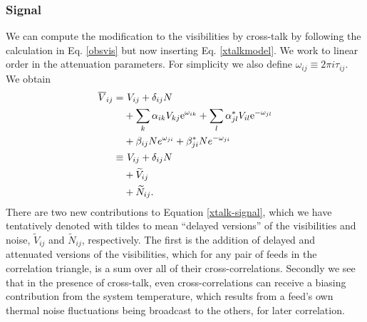 \subsubsection{Signal}
We can compute the modification to the visibilities by cross-talk by following the calculation in Eq. \ref{obsvis} but now inserting Eq. \ref{xtalkmodel}. We work to linear order in the attenuation parameters. For simplicity we also define $\omega_{ij} \equiv 2\pi i \tau_{ij}$. We obtain
\begin{align}
\overline{V}_{ij} = &~ V_{ij} + \delta_{ij} N
\nonumber \\
&+ \sum_k \alpha_{ik} V_{kj} {\rm e}^{\omega_{ik}} + \sum_l \alpha^*_{jl} V_{il} {\rm e}^{-\omega_{jl}}
\nonumber \\
&+ \beta_{ij} N e^{\omega_{ji}} + \beta_{ji}^*N e^{- \omega_{ji}}
\label{xtalk-signal} \\ \nonumber
\equiv &~ V_{ij} + \delta_{ij} N
\\ \nonumber &+ \widetilde{V}_{ij}
\\ &+ \widetilde{N}_{ij}. \label{tilde-def}
\end{align}
There are two new contributions to Equation \ref{xtalk-signal}, which we have tentatively denoted with tildes to mean ``delayed versions'' of the visibilities and noise, $\widetilde{V}_{ij}$ and $\widetilde{N}_{ij}$, respectively. The first is the addition of delayed and attenuated versions of the visibilities, which for any pair of feeds in the correlation triangle, is a sum over all of their cross-correlations. Secondly we see that in the presence of cross-talk, even cross-correlations can receive a biasing contribution from the system temperature, which results from a feed's own thermal noise fluctuations being broadcast to the others, for later correlation.

